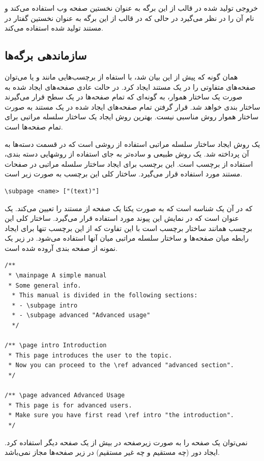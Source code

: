 خروجی تولید شده در قالب  از این برگه به عنوان نخستین صفحه وب استفاده
می‌کند و نام آن را  در نظر می‌گیرد در حالی که در قالب 
از این برگه به عنوان نخستین گفتار در مستند تولید شده استفاده می‌کند.

\subsection{سازماندهی برگه‌ها}

همان گونه که پیش از این بیان شد،  با استفاه از برچسب‌هایی مانند  و
یا  می‌توان صفحه‌های متفاوتی را در یک مستند ایجاد کرد. در حالت عادی
صفحه‌های ایجاد شده به صورت یک ساختار هموار، به گونه‌ای که تمام صفحه‌ها در یک سطح
قرار می‌گیرند ساختار بندی خواهد شد. قرار گرفتن تمام صفحه‌های ایجاد شده در یک
مستند به صورت ساختار هموار روش مناسبی نیست. بهترین روش ایجاد یک ساختار سلسله
مراتبی برای تمام صفحه‌ها است.

یک روش ایجاد ساختار سلسله مراتبی استفاده از روشی است که در قسمت دسته‌ها به آن
پرداخته شد. یک روش طبیعی و ساده‌تر به جای استفاده از روشهایی دسته بندی، استفاده
از برچسب  است. این برچسب برای ایجاد ساختار سلسله مراتبی در صفحات
مستند مورد استفاده قرار می‌گیرد. ساختار کلی این برچسب به صورت زیر است.

\begin{latin}
\lstset{language=C++}  
\begin{lstlisting}[frame=single] 
\subpage <name> ["(text)"]
\end{lstlisting}
\end{latin}

که در آن  یک شناسه است که به صورت یکتا یک صفحه از مستند را تعیین
می‌کند.  یک عنوان است که در نمایش این پیوند مورد استفاده قرار می‌گیرد.
ساختار کلی این برچسب همانند ساختار برچسب  است با این تفاوت که از این
برچسب تنها برای ایجاد رابطه میان صفحه‌ها و ساختار سلسله مراتبی میان آنها استفاده
می‌شود. در زیر یک نمونه از صفحه بندی آروده شده است.
\begin{latin}
\lstset{language=C++}  
\begin{lstlisting}[frame=single] 
/**
 * \mainpage A simple manual
 * Some general info.
  * This manual is divided in the following sections:
  * - \subpage intro
  * - \subpage advanced "Advanced usage"
  */

/** \page intro Introduction
 * This page introduces the user to the topic.
 * Now you can proceed to the \ref advanced "advanced section".
 */

/** \page advanced Advanced Usage
 * This page is for advanced users.
 * Make sure you have first read \ref intro "the introduction".
 */
\end{lstlisting}
\end{latin}

\begin{note}
نمی‌توان یک صفحه را به صورت زیرصفحه در بیش از یک صفحه دیگر  استفاده کرد. ایجاد
دور (چه مستقیم و چه غیر مستقیم) در زیر صفحه‌ها مجاز نمی‌باشد.
\end{note}


